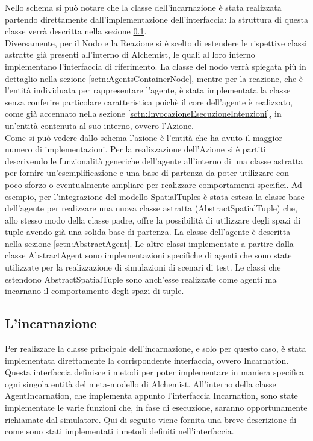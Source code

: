 Nello schema si può notare che la classe dell'incarnazione è stata realizzata partendo direttamente dall'implementazione dell'interfaccia: la struttura di questa classe verrà descritta nella sezione \ref{sctn:AgentIncarnation}.
\\
Diversamente, per il Nodo e la Reazione si è scelto di estendere le rispettive classi astratte già presenti all'interno di Alchemist, le quali al loro interno implementano l'interfaccia di riferimento. La classe del nodo verrà spiegata più in dettaglio nella sezione \ref{sctn:AgentsContainerNode}, mentre per la reazione, che è l'entità individuata per rappresentare l'agente, è stata implementata la classe senza conferire particolare caratteristica poichè il core dell'agente è realizzato, come già accennato nella sezione \ref{sctn:InvocazioneEsecuzioneIntenzioni}, in un'entità contenuta al suo interno, ovvero l'Azione.
\\
Come si può vedere dallo schema l'azione è l'entità che ha avuto il maggior numero di implementazioni. Per la realizzazione dell'Azione si è partiti descrivendo le funzionalità generiche dell'agente all'interno di una classe astratta per fornire un'esemplificazione e una base di partenza da poter utilizzare con poco sforzo o eventualmente ampliare per realizzare comportamenti specifici.
Ad esempio, per l'integrazione del modello SpatialTuples è stata estesa la classe base dell'agente per realizzare una nuova classe astratta (AbstractSpatialTuple) che, allo stesso modo della classe padre, offre la possibilità di utilizzare degli spazi di tuple avendo già una solida base di partenza. La classe dell'agente è descritta nella sezione \ref{sctn:AbstractAgent}.
Le altre classi implementate a partire dalla classe AbstractAgent sono implementazioni specifiche di agenti che sono state utilizzate per la realizzazione di simulazioni di scenari di test. Le classi che estendono AbstractSpatialTuple sono anch'esse realizzate come agenti ma incarnano il comportamento degli spazi di tuple.

\subsection{L'incarnazione}\label{sctn:AgentIncarnation}
Per realizzare la classe principale dell'incarnazione, e solo per questo caso, è stata implementata direttamente la corrispondente interfaccia, ovvero Incarnation.
Questa interfaccia definisce i metodi per poter implementare in maniera specifica ogni singola entità del meta-modello di Alchemist. All'interno della classe AgentIncarnation, che implementa appunto l'interfaccia Incarnation, sono state implementate le varie funzioni che, in fase di esecuzione, saranno opportunamente richiamate dal simulatore. Qui di seguito viene fornita una breve descrizione di come sono stati implementati i metodi definiti nell'interfaccia.

